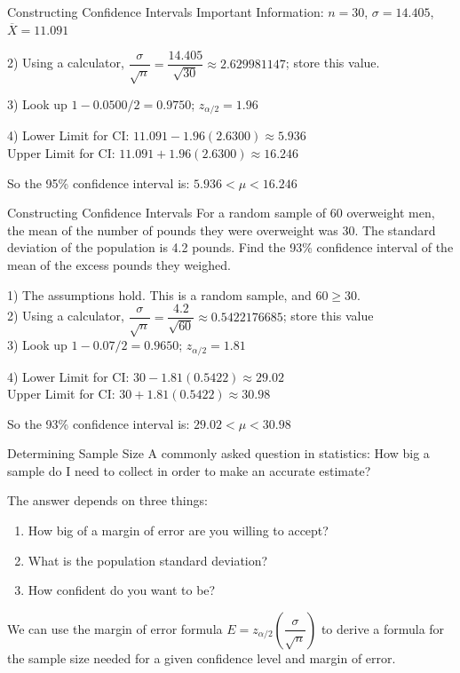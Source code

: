 \documentclass[t, aspectratio=169]{beamer}
\newcommand{\fp}[1]{\left({#1}\right)} %
\newcommand{\?}{\stackrel{?}{=}}
\begin{document}
	\begin{frame}{Constructing Confidence Intervals}
		Important Information: $n = 30$, $\sigma = 14.405$, $\overline{X} = 11.091$
		
		2) Using a calculator, $\dfrac{\sigma}{\sqrt{n}} = \dfrac{14.405}{\sqrt{30}} \approx 2.629981147$; store this value. \pause
		
		3) Look up $1 - 0.0500/2 = 0.9750$\pause; $z_{\alpha/2} = 1.96$ \pause
		
		4) Lower Limit for CI: $11.091 - 1.96(2.6300) \approx 5.936$ \pause \\
		Upper Limit for CI: $11.091 + 1.96(2.6300) \approx 16.246$ \pause
		
		So the 95\% confidence interval is: $5.936 < \mu < 16.246$
	\end{frame}

	\begin{frame}{Constructing Confidence Intervals}
		For a random sample of 60 overweight men, the mean of the number of pounds they were overweight was 30. The standard deviation of the population is 4.2 pounds. Find the 93\% confidence interval of the mean of the excess pounds they weighed. \pause
		
		1) The assumptions hold. This is a random sample, and $60 \geq 30$. \pause \\
		2) Using a calculator, $\dfrac{\sigma}{\sqrt{n}} = \dfrac{4.2}{\sqrt{60}} \approx 0.5422176685$; store this value \pause \\
		3) Look up $1 - 0.07/2 = 0.9650$\pause; $z_{\alpha/2} = 1.81$ \pause
		
		4) Lower Limit for CI: $30 - 1.81(0.5422) \approx 29.02$ \pause \\
		Upper Limit for CI: $30 + 1.81(0.5422) \approx 30.98$ \pause
		
		So the 93\% confidence interval is: $29.02 < \mu < 30.98$
	\end{frame}

	\begin{frame}{Determining Sample Size}
		A commonly asked question in statistics: How big a sample do I need to collect in order to make an accurate estimate? \pause
		
		The answer depends on three things: \begin{enumerate}[1)]
			\item How big of a margin of error are you willing to accept? \pause
			\item What is the population standard deviation? \pause
			\item How confident do you want to be? \pause
		\end{enumerate}
	
		We can use the margin of error formula $E = z_{\alpha / 2}\fp{\dfrac{\sigma}{\sqrt{n}}}$ to derive a formula for the sample size needed for a given confidence level and margin of error.
	\end{frame}
\end{document}
